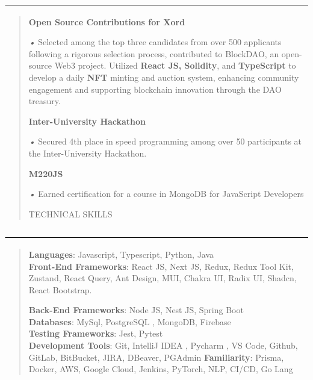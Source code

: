 \documentclass[
]{article}
\begin{document}
\includegraphics[width=7.5in,height=\textheight]{vertopal_6d2e6bfb3b634523a1faf107b161d186/media/image1.png}

\begin{quote}
\textbf{Open Source Contributions for Xord}

\emph{•} Selected among the top three candidates from over 500
applicants following a rigorous selection process, contributed to
BlockDAO, an open-source Web3 project. Utilized \textbf{React JS,
Solidity}, and \textbf{TypeScript} to develop a daily \textbf{NFT}
minting and auction system, enhancing community engagement and
supporting blockchain innovation through the DAO treasury.

\textbf{Inter-University Hackathon}

\emph{•} Secured 4th place in speed programming among over 50
participants at the Inter-University Hackathon.

\textbf{M220JS}

\emph{•} Earned certification for a course in MongoDB for JavaScript
Developers

TECHNICAL SKILLS
\end{quote}

\includegraphics[width=7.5in,height=\textheight]{vertopal_6d2e6bfb3b634523a1faf107b161d186/media/image1.png}

\begin{quote}
\textbf{Languages}: Javascript, Typescript, Python, Java\\
\textbf{Front-End Frameworks}: React JS, Next JS, Redux, Redux Tool Kit,
Zustand, React Query, Ant Design, MUI, Chakra UI, Radix UI, Shadcn,
React Bootstrap.

\textbf{Back-End Frameworks}: Node JS, Nest JS, Spring Boot\\
\textbf{Databases}: MySql, PostgreSQL , MongoDB, Firebase\\
\textbf{Testing Frameworks}: Jest, Pytest\\
\textbf{Development Tools}: Git, IntelliJ IDEA , Pycharm , VS Code,
Github, GitLab, BitBucket, JIRA, DBeaver, PGAdmin \textbf{Familiarity}:
Prisma, Docker, AWS, Google Cloud, Jenkins, PyTorch, NLP, CI/CD, Go Lang
\end{quote}
\end{document}
